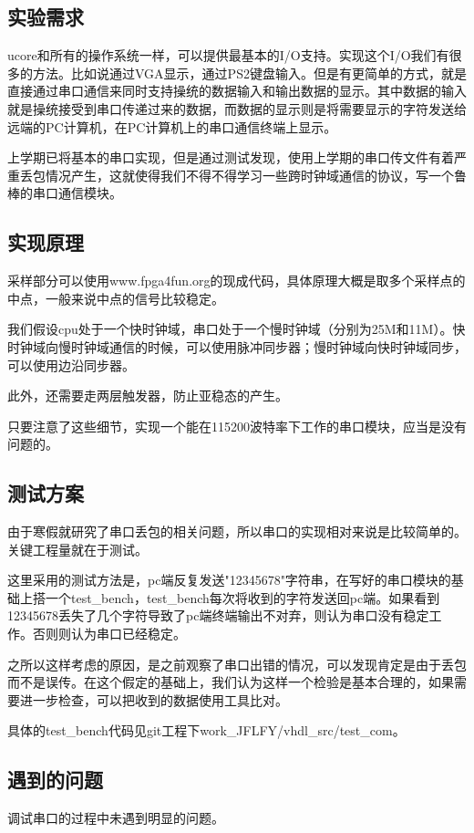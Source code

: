 \subsection{实验需求}
ucore和所有的操作系统一样，可以提供最基本的I/O支持。实现这个I/O我们有很多的方法。比如说通过VGA显示，通过PS2键盘输入。但是有更简单的方式，就是直接通过串口通信来同时支持操统的数据输入和输出数据的显示。其中数据的输入就是操统接受到串口传递过来的数据，而数据的显示则是将需要显示的字符发送给远端的PC计算机，在PC计算机上的串口通信终端上显示。

上学期已将基本的串口实现，但是通过测试发现，使用上学期的串口传文件有着严重丢包情况产生，这就使得我们不得不得学习一些跨时钟域通信的协议，写一个鲁棒的串口通信模块。

\subsection{实现原理}
采样部分可以使用www.fpga4fun.org的现成代码，具体原理大概是取多个采样点的中点，一般来说中点的信号比较稳定。

我们假设cpu处于一个快时钟域，串口处于一个慢时钟域（分别为25M和11M）。快时钟域向慢时钟域通信的时候，可以使用脉冲同步器；慢时钟域向快时钟域同步，可以使用边沿同步器。

此外，还需要走两层触发器，防止亚稳态的产生。

只要注意了这些细节，实现一个能在115200波特率下工作的串口模块，应当是没有问题的。

\subsection{测试方案}
由于寒假就研究了串口丢包的相关问题，所以串口的实现相对来说是比较简单的。关键工程量就在于测试。

这里采用的测试方法是，pc端反复发送"12345678"字符串，在写好的串口模块的基础上搭一个test\_bench，test\_bench每次将收到的字符发送回pc端。如果看到12345678丢失了几个字符导致了pc端终端输出不对弃，则认为串口没有稳定工作。否则则认为串口已经稳定。

之所以这样考虑的原因，是之前观察了串口出错的情况，可以发现肯定是由于丢包而不是误传。在这个假定的基础上，我们认为这样一个检验是基本合理的，如果需要进一步检查，可以把收到的数据使用工具比对。

具体的test\_bench代码见git工程下work\_JFLFY/vhdl\_src/test\_com。

\subsection{遇到的问题}
调试串口的过程中未遇到明显的问题。

